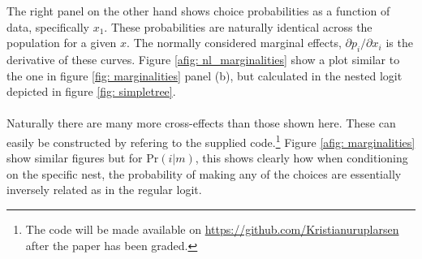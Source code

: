 The right panel on the other hand shows choice probabilities as a function of data, specifically $x_1$. These probabilities are naturally identical across the population for a given $x$. The normally considered marginal effects, $\partial p_i / \partial x_i$ is the derivative of these curves. Figure \ref{afig: nl_marginalities} show a plot similar to the one in figure \ref{fig: marginalities} panel (b), but calculated in the nested logit depicted in figure \ref{fig: simpletree}.
\\ \\
Naturally there are many more cross-effects than those shown here. These can easily be constructed by refering to the supplied code.\footnote{The code will be made available on \url{https://github.com/Kristianuruplarsen} after the paper has been graded.} Figure \ref{afig: marginalities} show similar figures but for $\textrm{Pr}(i|m)$, this shows clearly how when conditioning on the specific nest, the probability of making any of the choices are essentially inversely related as in the regular logit.
